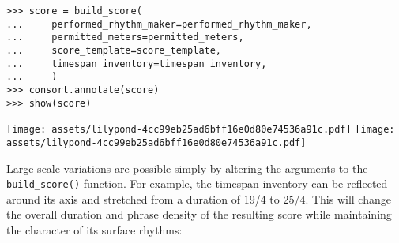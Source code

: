 \begin{abjadbookoutput}
\begin{singlespacing}
\vspace{-0.5\baselineskip}
\begin{verbatim}
>>> score = build_score(
...     performed_rhythm_maker=performed_rhythm_maker,
...     permitted_meters=permitted_meters,
...     score_template=score_template,
...     timespan_inventory=timespan_inventory,
...     )
>>> consort.annotate(score)
>>> show(score)
\end{verbatim}
\noindent\texttt{[image: assets/lilypond-4cc99eb25ad6bff16e0d80e74536a91c.pdf]}
\newline
\newline
\noindent\texttt{[image: assets/lilypond-4cc99eb25ad6bff16e0d80e74536a91c.pdf]}
\end{singlespacing}
\end{abjadbookoutput}

\noindent Large-scale variations are possible simply by altering the arguments
to the \texttt{build\_score()} function. For example, the timespan inventory
can be reflected around its axis and stretched from a duration of 19/4 to 25/4.
This will change the overall duration and phrase density of the resulting score
while maintaining the character of its surface rhythms:

\begin{comment}
<abjad>[stylesheet=../consort-small.ily]
multiplier = Duration(24, 4) / Duration(19, 4)
timespan_inventory = timespan_inventory.reflect()
timespan_inventory = timespan_inventory.stretch(multiplier)
timespan_inventory = timespan_inventory.round_offsets(Duration(1, 8))
show(timespan_inventory, key='voice_name')
score = build_score(
    performed_rhythm_maker=performed_rhythm_maker,
    permitted_meters=permitted_meters,
    score_template=score_template,
    timespan_inventory=timespan_inventory,
    )
consort.annotate(score)
show(score)
</abjad>
\end{comment}

